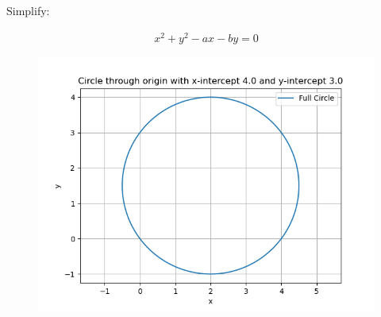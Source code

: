 \documentclass{article}
\begin{document}
Simplify:


\begin{align}
x^2 + y^2 - ax - by = 0
\end{align}

\begin{figure}[H]
    \centering
    \includegraphics[width=0.7\linewidth]{./figs/Figure_1.png}
    \caption{}
    \label{fig:fig1}
\end{figure}
\end{document}
